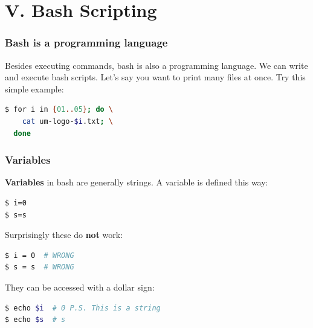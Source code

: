\section{V. Bash Scripting}
\begin{frame}[fragile]
\frametitle{Bash is a programming language}

Besides executing commands, bash is also a programming language. We can write
and execute bash scripts.
\newline \newline
Let's say you want to print many files at once.
\newline \newline
Try this simple example:
\begin{lstlisting}[language=bash]
$ for i in {01..05}; do \
    cat um-logo-$i.txt; \
  done
\end{lstlisting}
\end{frame}


\begin{frame}[fragile]
\frametitle{Variables}
\textbf{Variables} in bash are generally strings.
A variable is defined this way:
\begin{lstlisting}[language=bash]
$ i=0
$ s=s
\end{lstlisting}
Surprisingly these do \textbf{not} work:
\begin{lstlisting}[language=bash]
$ i = 0  # WRONG
$ s = s  # WRONG
\end{lstlisting}
They can be accessed with a dollar sign:
\begin{lstlisting}[language=bash]
$ echo $i  # 0 P.S. This is a string
$ echo $s  # s
\end{lstlisting}
\end{frame}

